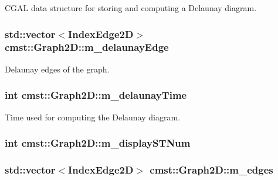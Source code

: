 CGAL data structure for storing and computing a Delaunay diagram. 

\subsubsection[{\texorpdfstring{m\_delaunayEdge}{m_delaunayEdge}}]{\setlength{\rightskip}{0pt plus 5cm}std::vector$<${\bf IndexEdge2D}$>$ cmst::Graph2D::m\_delaunayEdge\hspace{0.3cm}{\ttfamily [protected]}}\hypertarget{classcmst_1_1_graph2_d_a6fe64b2078ec3c700a8a2e2bd77e2dae}{}\label{classcmst_1_1_graph2_d_a6fe64b2078ec3c700a8a2e2bd77e2dae}


Delaunay edges of the graph. 

\subsubsection[{\texorpdfstring{m\_delaunayTime}{m_delaunayTime}}]{\setlength{\rightskip}{0pt plus 5cm}int cmst::Graph2D::m\_delaunayTime\hspace{0.3cm}{\ttfamily [private]}}\hypertarget{classcmst_1_1_graph2_d_a869a2fef63a6dbc8733056afd9ad0b71}{}\label{classcmst_1_1_graph2_d_a869a2fef63a6dbc8733056afd9ad0b71}


Time used for computing the Delaunay diagram. 

\subsubsection[{\texorpdfstring{m\_displaySTNum}{m_displaySTNum}}]{\setlength{\rightskip}{0pt plus 5cm}int cmst::Graph2D::m\_displaySTNum\hspace{0.3cm}{\ttfamily [private]}}\hypertarget{classcmst_1_1_graph2_d_aa5479777b7d8650b85c15b1f8a54bd95}{}\label{classcmst_1_1_graph2_d_aa5479777b7d8650b85c15b1f8a54bd95}
\subsubsection[{\texorpdfstring{m\_edges}{m_edges}}]{\setlength{\rightskip}{0pt plus 5cm}std::vector$<${\bf IndexEdge2D}$>$ cmst::Graph2D::m\_edges\hspace{0.3cm}{\ttfamily [protected]}}\hypertarget{classcmst_1_1_graph2_d_a31a6b042c1c1941ee59672b842c7d3c9}{}\label{classcmst_1_1_graph2_d_a31a6b042c1c1941ee59672b842c7d3c9}


